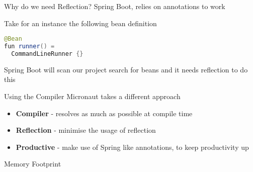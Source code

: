 \documentclass{beamer}
\begin{document}
  \begin{frame}[t,fragile]{Why do we need Reflection?}
    Spring Boot, relies on annotations to work

    Take for an instance the following bean definition

    \vspace{16pt}
    \begin{lstlisting}[language=Java, backgroundcolor = \color{green!5}]
@Bean
fun runner() =
  CommandLineRunner {}
    \end{lstlisting}

    \vspace{16pt}
    Spring Boot will scan our project search for beans and it needs reflection to do this
  \end{frame}


  \begin{frame}[t]{Using the Compiler}
    Micronaut takes a different approach
    \begin{itemize}
      \item \textbf{Compiler} - resolves as much as possible at compile time
      \item \textbf{Reflection} - minimise the usage of reflection
      \item \textbf{Productive} - make use of Spring like annotations, to keep productivity up
    \end{itemize}
  \end{frame}


  \begin{frame}[t]{Memory Footprint}
    \begin{center}
    \end{center}
  \end{frame}
\end{document}
